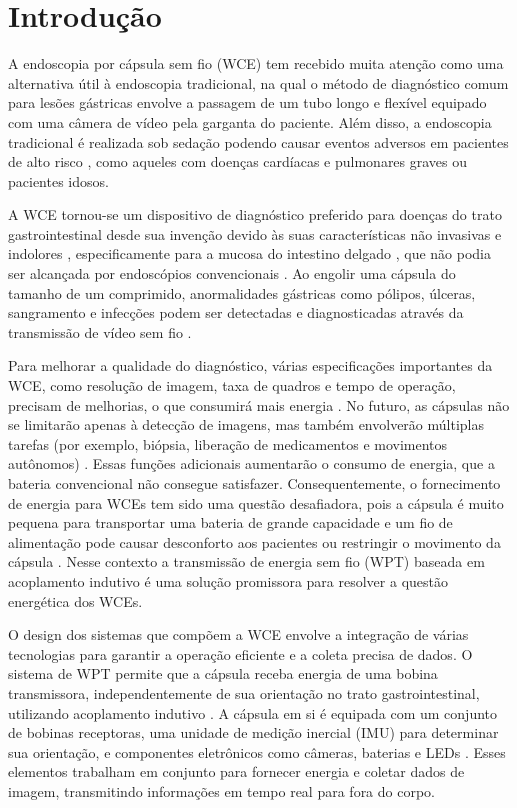 \documentclass[repeatfields,xlists,xpacks,oneside]{ufrgscca}
\begin{document}
\chapter{Introdução}

A endoscopia por cápsula sem fio (WCE) tem recebido muita atenção como uma alternativa útil à endoscopia tradicional, na qual o método de diagnóstico comum para lesões gástricas envolve a passagem de um tubo longo e flexível equipado com uma câmera de vídeo pela garganta do paciente. Além disso, a endoscopia tradicional é realizada sob sedação podendo causar eventos adversos em pacientes de alto risco \cite{amornyotin2013sedation}, como aqueles com doenças cardíacas e pulmonares graves ou pacientes idosos.

A WCE tornou-se um dispositivo de diagnóstico preferido para doenças do trato gastrointestinal desde sua invenção devido às suas características não invasivas e indolores \cite{iddan2000wireless}, especificamente para a mucosa do intestino delgado \cite{pennazio2004outcome}, que não podia ser alcançada por endoscópios convencionais \cite{pennazio2004outcome}. Ao engolir uma cápsula do tamanho de um comprimido, anormalidades gástricas como pólipos, úlceras, sangramento e infecções podem ser detectadas e diagnosticadas através da transmissão de vídeo sem fio \cite{khan2020computer}.

Para melhorar a qualidade do diagnóstico, várias especificações importantes da WCE, como resolução de imagem, taxa de quadros e tempo de operação, precisam de melhorias, o que consumirá mais energia \cite{basar2014application}. No futuro, as cápsulas não se limitarão apenas à detecção de imagens, mas também envolverão múltiplas tarefas (por exemplo, biópsia, liberação de medicamentos e movimentos autônomos) \cite{meng2021novel}. Essas funções adicionais aumentarão o consumo de energia, que a bateria convencional não consegue satisfazer. Consequentemente, o fornecimento de energia para WCEs tem sido uma questão desafiadora, pois a cápsula é muito pequena para transportar uma bateria de grande capacidade e um fio de alimentação pode causar desconforto aos pacientes ou restringir o movimento da cápsula \cite{gao2022stable}. Nesse contexto a transmissão de energia sem fio (WPT) baseada em acoplamento indutivo é uma solução promissora para resolver a questão energética dos WCEs.

O design dos sistemas que compõem a WCE envolve a integração de várias tecnologias para garantir a operação eficiente e a coleta precisa de dados. O sistema de WPT permite que a cápsula receba energia de uma bobina transmissora, independentemente de sua orientação no trato gastrointestinal, utilizando acoplamento indutivo \cite{kim2021capsule}. A cápsula em si é equipada com um conjunto de bobinas receptoras, uma unidade de medição inercial (IMU) para determinar sua orientação, e componentes eletrônicos como câmeras, baterias e LEDs \cite{zhang2024transmitter}. Esses elementos trabalham em conjunto para fornecer energia e coletar dados de imagem, transmitindo informações em tempo real para fora do corpo.
\end{document}
